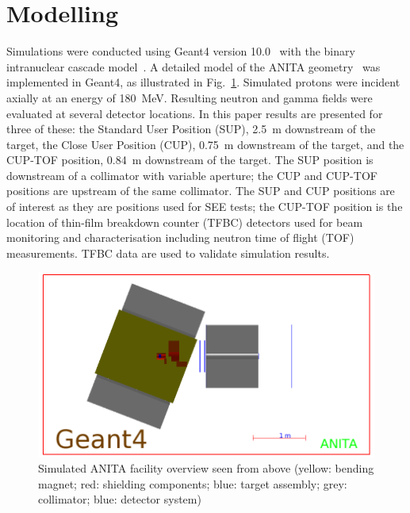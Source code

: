 \documentclass[peerreviewca,11pt,a4paper]{IEEEtran}
\let\MYoriglatexcaption\caption
\renewcommand{\caption}[2][\relax]{\MYoriglatexcaption[#2]{#2}}
\begin{document}
\section{Modelling}
Simulations were conducted using Geant4 version 10.0~\cite{Agostinelli2003,Allison2006} with the binary intranuclear cascade model~\cite{Platt2013}.
A detailed model of the ANITA geometry~\cite{Prokofiev2009,Prokofiev2014} was implemented in Geant4, as illustrated in Fig.~\ref{fig:ANITAoverview}.
Simulated protons were incident axially at an energy of \SI{180}{\MeV}.
Resulting neutron and gamma fields were evaluated at several detector locations.
In this paper results are presented for three of these: the Standard User Position (SUP), \SI{2.5}{\m} downstream of the target, the Close User Position (CUP), \SI{0.75}{\m} downstream of the target, and the CUP-TOF position, \SI{0.84}{m} downstream of the target.
The SUP position is downstream of a collimator with variable aperture; the CUP and CUP-TOF positions are upstream of the same collimator.
The SUP and CUP positions are of interest as they are positions used for SEE tests; the CUP-TOF position is the location of thin-film breakdown counter (TFBC) detectors used for beam monitoring and characterisation including neutron time of flight (TOF) measurements.
TFBC data are used to validate simulation results.

\begin{figure}[t]
	\centering
	\includegraphics[width=\columnwidth]{overview.png}
	\caption{
        Simulated ANITA facility overview seen from above (yellow: bending magnet; red: shielding components; blue: target assembly; grey: collimator; blue: detector system)
    }
	\label{fig:ANITAoverview}
\end{figure}
\end{document}
